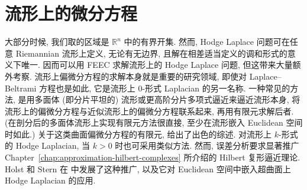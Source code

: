 \section{{流形上的微分方程}}\label{sec:manifold-equations}

{大部分时候, 我们取的区域是 $\mathbb R^n$ 中的有界开集. 然而, Hodge Laplace 问题可在任意 Riemannian 流形上定义, 无论有无边界, 且解在相差适当定义的调和形式的意义下唯一. 因而可以用 FEEC 求解流形上的 Hodge Laplace 问题, 但这带来大量额外考察. 流形上偏微分方程的求解本身就是重要的研究领域, 即使对 Laplace–Beltrami 方程也是如此, 它是流形上 0-形式 Laplacian 的另一名称. 一种常见的方法, 是用多面体 (即分片平坦的) 流形或更高阶分片多项式逼近来逼近流形本身, 将流形上的偏微分方程与近似流形上的偏微分方程联系起来, 再用有限元求解后者. (在剖分后的多面体流形上实现有限元方法很直接, 至少在流形嵌入 Euclidean 空间时如此.) 关于这类曲面偏微分方程的有限元,  给出了出色的综述. 对流形上 $k$-形式的 Hodge Laplacian, 当 $k>0$ 时也可采用类似方法. 然而, 误差分析要求显著推广 Chapter~\ref{chap:approximation-hilbert-complexes} 所介绍的 Hilbert 复形逼近理论. Holst 和 Stern 在  中发展了这种推广, 以及它对 Euclidean 空间中嵌入超曲面上 Hodge Laplacian 的应用.}
